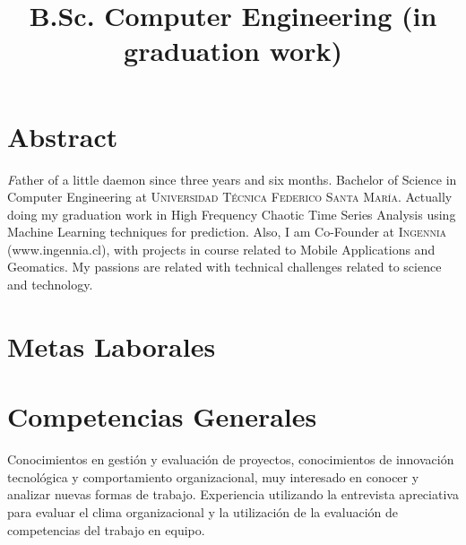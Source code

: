 \documentclass[11pt,letterpaper,roman]{moderncv}
\title{\normalfont \small B.Sc. Computer Engineering (in graduation work) }
\begin{document}
\maketitle

\section*{\textbf{Abstract}}
	\textsl
	Father of a little daemon since three years and six months. Bachelor of
Science in Computer Engineering at \textsc{Universidad Técnica Federico Santa María}.
	Actually doing my graduation work in High Frequency Chaotic Time Series Analysis using Machine Learning techniques for prediction.
	Also, I am Co-Founder at \textsc{Ingennia} (www.ingennia.cl), with
projects in course related to Mobile Applications and Geomatics. My passions are
related with technical challenges related to science and technology.
    \newline
\section{Metas Laborales}

\section{Competencias Generales}
	{Conocimientos en gesti\'on y evaluaci\'on de proyectos,
	conocimientos de innovaci\'on tecnol\'ogica y comportamiento organizacional,
	muy interesado en conocer y analizar nuevas formas de trabajo. Experiencia utilizando la 
	entrevista apreciativa para evaluar el clima organizacional y la utilizaci\'on de 
	la evaluaci\'on de competencias del trabajo en equipo.}	
\end{document}

